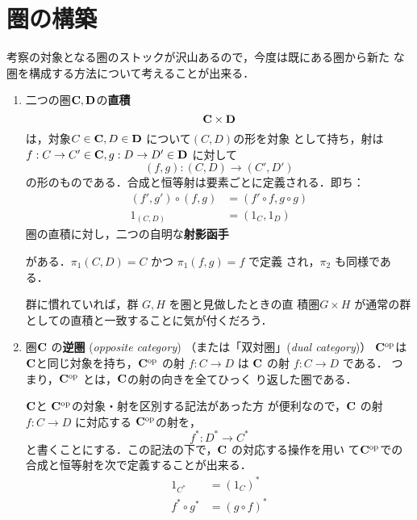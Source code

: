 \section{圏の構築}
考察の対象となる圏のストックが沢山あるので，今度は既にある圏から新た
な圏を構成する方法について考えることが出来る．

\begin{enumerate}
 \item 二つの圏${\bf C}, {\bf D}$の{\bfseries 直積}
       \[
	{\bf C} \times {\bf D}
       \]
       は，対象$C \in {\bf C}, D \in {\bf D}$ について$(C, D)$の形を対象
       として持ち，射は $f: C \to C' \in {\bf C}, g: D \to D' \in {\bf
       D}$ に対して
       \[
	(f, g) : (C, D) \to (C', D')
       \]
       の形のものである．合成と恒等射は要素ごとに定義される．即ち：
       \begin{align*}
	(f', g') \circ (f, g) &= (f' \circ f, g \circ g)\\
	            1_{(C,D)} &= (1_C, 1_D)
       \end{align*}
       圏の直積に対し，二つの自明な{\bfseries 射影函手}
       \begin{center}
       \end{center}
       がある．$\pi_1(C,D) = C$ かつ $\pi_1(f,g) = f$ で定義
       され，$\pi_2$ も同様である．

       群に慣れていれば，群 $G, H$ を圏と見做したときの直
       積圏$G \times H$ 
       が通常の群としての直積と一致することに気が付くだろう．
 \item 圏${\bf C}$ の{\bfseries 逆圏}
       ({\itshape opposite category})
       （または「双対圏」({\itshape dual
       category})）
       ${\bf C}^{\rm op}$は${\bf C}$と同じ対象を持ち，${\bf C}^{\rm op}$
       の射 $f: C \to D$ は ${\bf C}$ の射 $f: C \to D$ である．
       つまり，${\bf C}^{\rm op}$ とは，${\bf C}$の射の向きを全てひっく
       り返した圏である．

       ${\bf C}$と ${\bf C}^{\rm op}$の対象・射を区別する記法があった方
       が便利なので，${\bf C}$ の射 $f: C \to D$ に対応する ${\bf
       C}^{\rm op }$の射を，
       \[
	f^*: D^* \to C^*
       \]
       と書くことにする．この記法の下で，${\bf C}$ の対応する操作を用い
       て${\bf C}^{\rm op}$での合成と恒等射を次で定義することが出来る．
       \begin{align*}
	1_{C^*}       &= (1_C)^*\\
	f^* \circ g^* &= (g \circ f)^*
       \end{align*}


\end{enumerate}
